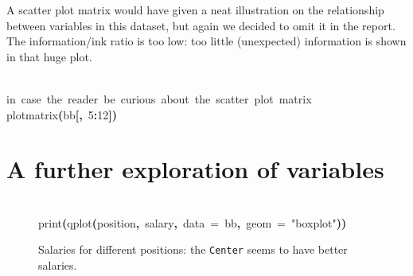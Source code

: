 \documentclass[english]{article}
\newenvironment{dummy}{\par}{\par}
\newcommand{\hlnumber}[1]{\textcolor[rgb]{0.0823529411764706,0.0784313725490196,0.709803921568627}{#1}}%
\newcommand{\hlfunctioncall}[1]{\textcolor[rgb]{1,0,0}{#1}}%
\newcommand{\hlstring}[1]{\textcolor[rgb]{0.6,0.6,1}{#1}}%
\newcommand{\hlkeyword}[1]{\textcolor[rgb]{0,0,0}{\textbf{#1}}}%
\newcommand{\hlargument}[1]{\textcolor[rgb]{0.694117647058824,0.247058823529412,0.0196078431372549}{#1}}%
\newcommand{\hlcomment}[1]{\textcolor[rgb]{0.8,0.8,0.8}{#1}}%
\newcommand{\hlsymbol}[1]{\textcolor[rgb]{0,0,0}{#1}}%
\newcommand{\hlprompt}[1]{\textcolor[rgb]{0,0,0}{#1}}%
\newcommand{\hlstd}[1]{\textcolor[rgb]{0,0,0}{#1}}%
\begin{document}
A scatter plot matrix would have given a neat illustration on the
relationship between variables in this dataset, but again we decided
to omit it in the report. The information/ink ratio is too low: too
little (unexpected) information is shown in that huge plot.
\begin{dummy}
\hspace*{\fill}\\
\hlstd{}\ttfamily\noindent
\hlprompt{\usebox{\hlnormalsizeboxgreaterthan}{\ }}\hlcomment{\usebox{\hlnormalsizeboxhash}\usebox{\hlnormalsizeboxhash}{\ }in{\ }case{\ }the{\ }reader{\ }be{\ }curious{\ }about{\ }the{\ }scatter{\ }plot{\ }matrix}\mbox{}
\normalfont
\hspace*{\fill}\\
\hlstd{}\ttfamily\noindent
\hlprompt{\usebox{\hlnormalsizeboxgreaterthan}{\ }}\hlfunctioncall{plotmatrix}\hlkeyword{(}\hlsymbol{bb}\hlkeyword{[}\hlkeyword{,}{\ }\hlnumber{5}\hlkeyword{:}\hlnumber{12}\hlkeyword{]}\hlkeyword{)}\mbox{}
\normalfont
\hspace*{\fill}\\
\hlstd{}
\end{dummy}

\section{A further exploration of variables\label{sec:new-variables}}

%
\begin{figure}
\begin{dummy}
\hspace*{\fill}\\
\hlstd{}\ttfamily\noindent
\hlprompt{\usebox{\hlnormalsizeboxgreaterthan}{\ }}\hlfunctioncall{print}\hlkeyword{(}\hlfunctioncall{qplot}\hlkeyword{(}\hlsymbol{position}\hlkeyword{,}{\ }\hlsymbol{salary}\hlkeyword{,}{\ }\hlargument{data}{\ }\hlargument{=}{\ }\hlsymbol{bb}\hlkeyword{,}{\ }\hlargument{geom}{\ }\hlargument{=}{\ }\hlstring{"boxplot"}\hlkeyword{)}\hlkeyword{)}\mbox{}
\normalfont
\hspace*{\fill}\\
\hlstd{}
\begin{center}


\endpgfgraphicnamed
\end{center}
\end{dummy}
\caption{Salaries for different positions: the \texttt{Center} seems to have
better salaries.\label{fig:salary-position}}

\end{figure}
\end{document}
